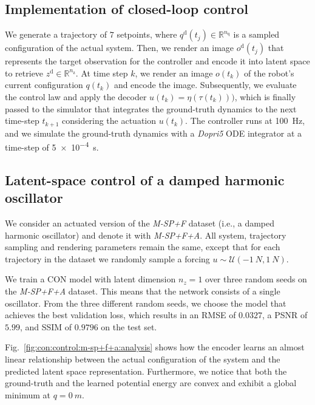 \subsection{Implementation of closed-loop control}
We generate a trajectory of $7$ setpoints, where $q^\mathrm{d}(t_j) \in \mathbb{R}^{n_\mathrm{q}}$ is a sampled configuration of the actual system.
Then, we render an image $o^\mathrm{d}(t_j)$ that represents the target observation for the controller and encode it into latent space to retrieve $z^\mathrm{d} \in \mathbb{R}^{n_\mathrm{z}}$.
At time step $k$, we render an image $o(t_k)$ of the robot's current configuration $q(t_k)$ and encode the image. 
Subsequently, we evaluate the control law and apply the decoder $u(t_k) = \eta(\tau(t_k)))$, which is finally passed to the simulator that integrates the ground-truth dynamics to the next time-step $t_{k+1}$ considering the actuation $u(t_k)$.
The controller runs at \SI{100}{Hz}, and we simulate the ground-truth dynamics with a \emph{Dopri5} \gls{ODE} integrator at a time-step of \num{5e-4}~\si{s}.

\subsection{Latent-space control of a damped harmonic oscillator}

We consider an actuated version of the \emph{M-SP+F} dataset (i.e., a damped harmonic oscillator) and denote it with \emph{M-SP+F+A}. All system, trajectory sampling and rendering parameters remain the same, except that for each trajectory in the dataset we randomly sample a forcing $u \sim \mathcal{U}(-\SI{1}{N}, \SI{1}{N})$.

We train a \gls{CON} model with latent dimension $n_z = 1$ over three random seeds on the \emph{M-SP+F+A} dataset. This means that the network consists of a single oscillator.
From the three different random seeds, we choose the model that achieves the best validation loss, which results in an RMSE of $0.0327$, a PSNR of $5.99$, and SSIM of $0.9796$ on the test set.

Fig.~\ref{fig:con:control:m-sp+f+a:analysis} shows how the encoder learns an almost linear relationship between the actual configuration of the system and the predicted latent space representation. Furthermore, we notice that both the ground-truth and the learned potential energy are convex and exhibit a global minimum at $q=\SI{0}{m}$.

